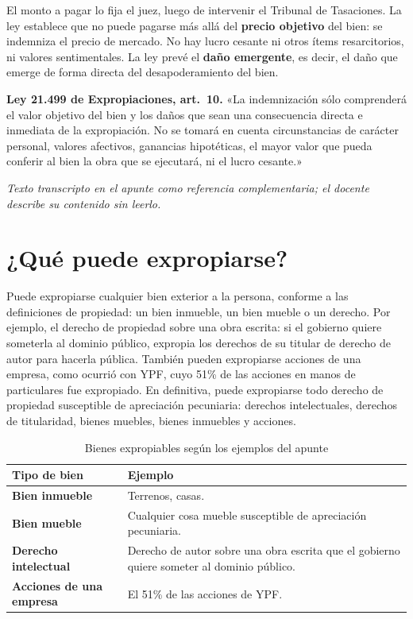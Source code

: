 \documentclass[12pt,oneside]{book}
\begin{document}
El monto a pagar lo fija el juez, luego de intervenir el Tribunal de Tasaciones. La ley establece que no puede pagarse más allá del \textbf{precio objetivo} del bien: se indemniza el precio de mercado. No hay lucro cesante ni otros ítems resarcitorios, ni valores sentimentales. La ley prevé el \textbf{daño emergente}, es decir, el daño que emerge de forma directa del desapoderamiento del bien.

\begin{note}
\textbf{Ley 21.499 de Expropiaciones, art.\ 10.} «La indemnización sólo comprenderá el valor objetivo del bien y los daños que sean una consecuencia directa e inmediata de la expropiación. No se tomará en cuenta circunstancias de carácter personal, valores afectivos, ganancias hipotéticas, el mayor valor que pueda conferir al bien la obra que se ejecutará, ni el lucro cesante.»

\textit{Texto transcripto en el apunte como referencia complementaria; el docente describe su contenido sin leerlo.}
\end{note}

\section{¿Qué puede expropiarse?}

Puede expropiarse cualquier bien exterior a la persona, conforme a las definiciones de propiedad: un bien inmueble, un bien mueble o un derecho. Por ejemplo, el derecho de propiedad sobre una obra escrita: si el gobierno quiere someterla al dominio público, expropia los derechos de su titular de derecho de autor para hacerla pública. También pueden expropiarse acciones de una empresa, como ocurrió con YPF, cuyo 51\% de las acciones en manos de particulares fue expropiado. En definitiva, puede expropiarse todo derecho de propiedad susceptible de apreciación pecuniaria: derechos intelectuales, derechos de titularidad, bienes muebles, bienes inmuebles y acciones.

\begin{table}[H]
\centering
\caption{Bienes expropiables según los ejemplos del apunte}
\renewcommand{\arraystretch}{1.25}
\begin{tabularx}{\textwidth}{>{\raggedright\arraybackslash}p{} >{\raggedright\arraybackslash}X}
\toprule
\textbf{Tipo de bien} & \textbf{Ejemplo} \\
\midrule
\textbf{Bien inmueble} & Terrenos, casas. \\
\textbf{Bien mueble} & Cualquier cosa mueble susceptible de apreciación pecuniaria. \\
\textbf{Derecho intelectual} & Derecho de autor sobre una obra escrita que el gobierno quiere someter al dominio público. \\
\textbf{Acciones de una empresa} & El 51\% de las acciones de YPF. \\
\bottomrule
\end{tabularx}
\end{table}
\end{document}
